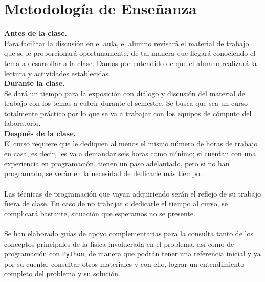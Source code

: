 \documentclass[12pt]{article}
\begin{document}
\section{Metodología de Enseñanza}
\textbf{Antes de la clase.}
\\
Para facilitar la discusión en el aula, el alumno revisará el material de trabajo que se le proporcionará oportunamente, de tal manera que llegará conociendo el tema a desarrollar a la clase. Damos por entendido de que el alumno realizará la lectura y actividades establecidas.
\\
\textbf{Durante la clase.}
\\
Se dará un tiempo para la exposición con diálogo y discusión del material de trabajo con los temas a cubrir durante el semestre. Se busca que sea un curso totalmente práctico por lo que se va a trabajar con los equipos de cómputo del laboratorio.
\\
\textbf{Después de la clase.}
\\
El curso requiere que le dediquen al menos el mismo número de horas de trabajo en casa, es decir, les va a demandar seis horas como mínimo; si cuentan con una experiencia en programación, tienen un paso adelantado, pero si no han programado, se verán en la necesidad de dedicarle más tiempo.
\\
\\
Las técnicas de programación que vayan adquiriendo serán el reflejo de su trabajo fuera de clase. En caso de no trabajar o dedicarle el tiempo al curso, se complicará bastante, situación que esperamos no se presente.
\\
\\
Se han elaborado guías de apoyo complementarias para la consulta tanto de los conceptos principales de la física involucrada en el problema, así como de programación con \texttt{Python}, de manera que podrán tener una referencia inicial y ya por su cuenta, consultar otros materiales y con ello, lograr un entendimiento completo del problema y su solución.
\end{document}
